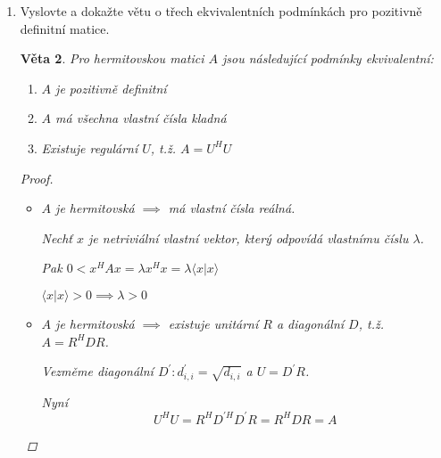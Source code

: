 \documentclass[10pt,a4paper]{article}
\theoremstyle{plain}
\newtheorem{veta}{Věta}
\begin{document}
\begin{enumerate}
\begin{veta}
V je prostor se skalárním součinem a bází $X = (v_1, ..., v_n)$

Potom gramova matice $A,\ a_{ij} = \langle v_i | v_j \rangle$ splňuje

\[ \forall u,w \in V: \langle u | w \rangle = [w]_X^H A^T [u]_X \]
\begin{proof}
Označme $[u]_X = (\alpha_1, \alpha_2, ..., \alpha_n)^T$ a

$[w]_X = (\beta_1, \beta_2, ..., \beta_n)^T$

Pak
\[  \langle u | w \rangle = \left\langle \sum^n_{i=1} \alpha_i v_i | \sum^n_{j=1} \beta_j v_j \right\rangle = \sum^n_{i=1}\sum^n_{j=1} \alpha_i \beta_j  \langle v_i |  v_j \rangle = [w]_X^H A^T [u]_X \]

\end{proof}
\end{veta}


\item Vyslovte a dokažte větu o třech ekvivalentních podmínkách pro pozitivně definitní matice.

\begin{veta}
Pro hermitovskou matici $A$ jsou následující podmínky ekvivalentní:
\begin{enumerate}
\item $A$ je pozitivně definitní
\item $A$ má všechna vlastní čísla kladná
\item Existuje regulární $U$, t.ž. $A = U^HU$
\end{enumerate}
\begin{proof}$\ $
\begin{itemize}
\item[$1 \implies 2$] 
$A$ je hermitovská $\implies$ má vlastní čísla reálná.

Nechť $x$ je netriviální vlastní vektor, který odpovídá vlastnímu číslu $\lambda$.

Pak $0 < x^HAx =  \lambda x^Hx = \lambda \langle x | x \rangle$

$\langle x | x \rangle > 0 \implies \lambda > 0$

\item[$2 \implies 3$]
$A$ je hermitovská $\implies$ existuje unitární $R$ a diagonální $D$, t.ž. $A = R^HDR$.

Vezměme diagonální $D^\prime: d^\prime_{i,i} = \sqrt{d_{i,i}}$ a $U = D^\prime R$.

Nyní \[ U^HU =  R^H D^{\prime H} D^\prime R = R^HDR = A\]


\end{itemize}
\end{proof}
\end{veta}
\end{enumerate}
\end{document}
